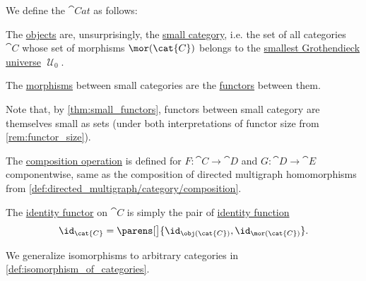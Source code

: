 \begin{definition}\label{def:category_of_small_categories}
  We define the  \( \cat{Cat} \) as follows:
  \begin{thmenum}
     The \hyperref[def:category/objects]{objects} are, unsurprisingly, the \hyperref[def:small_category]{small category}, i.e. the set of all categories \( \cat{C} \) whose set of morphisms \( \mor(\cat{C}) \) belongs to the \hyperref[def:smallest_grothendieck_universe]{smallest Grothendieck universe} \( \mscrU_0 \).

     The \hyperref[def:category/morphisms]{morphisms} between small categories are the \hyperref[def:functor]{functors} between them.

    Note that, by \cref{thm:small_functors}, functors between small category are themselves small as sets (under both interpretations of functor size from \cref{rem:functor_size}).

     The \hyperref[def:category/composition]{composition operation} is defined for \( F: \cat{C} \to \cat{D} \) and \( G: \cat{D} \to \cat{E} \) componentwise, same as the composition of directed multigraph homomorphisms from \cref{def:directed_multigraph/category/composition}.

     The \hyperref[def:category/identity]{identity functor} on \( \cat{C} \) is simply the pair of \hyperref[def:set_valued_function/identity]{identity function}
    \begin{equation*}
      \id_{\cat{C}} = \parens[\big]{ \id_{\obj(\cat{C})}, \id_{\mor(\cat{C})} }.
    \end{equation*}
  \end{thmenum}
\end{definition}
\begin{comments}
  \item We generalize isomorphisms to arbitrary categories in \cref{def:isomorphism_of_categories}.
\end{comments}
